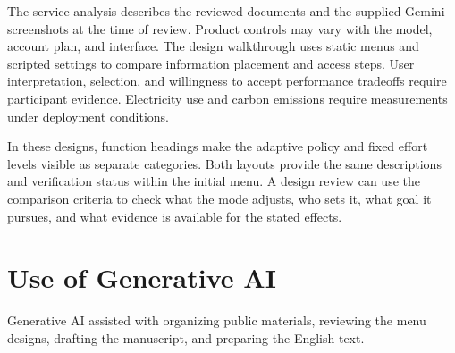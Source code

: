 \documentclass[11pt,letterpaper]{article}
\begin{document}
The service analysis describes the reviewed documents and the supplied
Gemini screenshots at the time of review. Product controls may vary
with the model, account plan, and interface. The design walkthrough
uses static menus and scripted settings to compare information
placement and access steps. User interpretation, selection, and
willingness to accept performance tradeoffs require participant
evidence. Electricity use and carbon emissions require measurements
under deployment conditions.

In these designs, function headings make the adaptive policy and
fixed effort levels visible as separate categories. Both layouts
provide the same descriptions and verification status within the
initial menu. A design review can use the comparison criteria to
check what the mode adjusts, who sets it, what goal it pursues, and
what evidence is available for the stated effects.

\section*{Use of Generative AI}

Generative AI assisted with organizing public materials, reviewing the
menu designs, drafting the manuscript, and preparing the English text.
\end{document}
